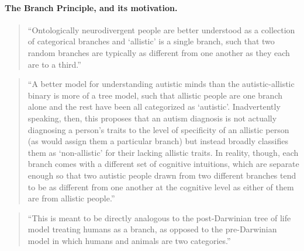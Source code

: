 \paragraph{The Branch Principle, and its motivation.}
\begin{quote}
``Ontologically neurodivergent people are better understood as a collection of categorical branches and `allistic' is a single branch, such that two random branches are typically as different from one another as they each are to a third.''
\end{quote}
\begin{quote}
``A better model for understanding autistic minds than the autistic-allistic binary is more of a tree model, such that allistic people are one branch alone and the rest have been all categorized as `autistic'. Inadvertently speaking, then, this proposes that an autism diagnosis is not actually diagnosing a person's traits to the level of specificity of an allistic person (as would assign them a particular branch) but instead broadly classifies them as `non-allistic' for their lacking allistic traits. In reality, though, each branch comes with a different set of cognitive intuitions, which are separate enough so that two autistic people drawn from two different branches tend to be as different from one another at the cognitive level as either of them are from allistic people.''
\end{quote}
\begin{quote}
``This is meant to be directly analogous to the post-Darwinian tree of life model treating humans as a branch, as opposed to the pre-Darwinian model in which humans and animals are two categories.''
\end{quote}

